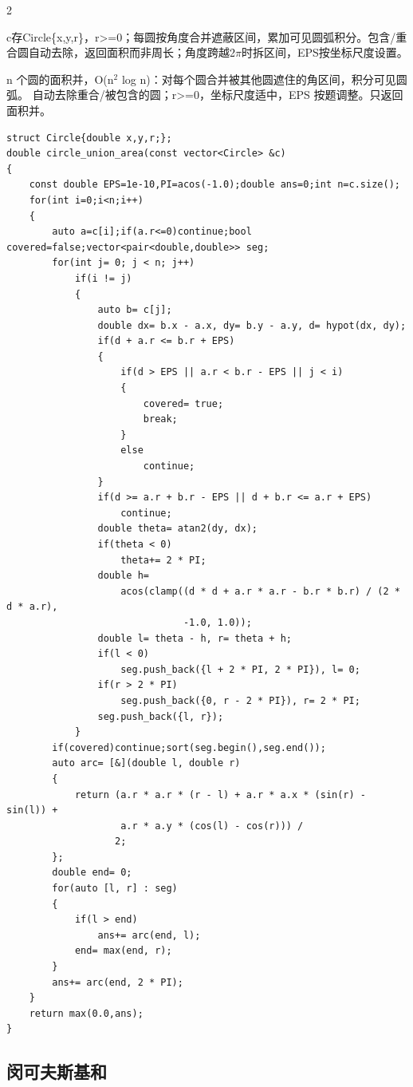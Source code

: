 \documentclass[UTF8,fontset=fandol,a4paper,twoside]{ctexart}
\newcommand{\note}[1]{{\fontsize{10}{12}\selectfont #1\par}}
\begin{document}
\begin{multicols}{2}
\note{c存Circle\{x,\allowbreak{}y,\allowbreak{}r\}，r>\allowbreak{}=\allowbreak{}0；每圆按角度合并遮蔽区间，累加可见圆弧积分。包含/\allowbreak{}重合圆自动去除，返回面积而非周长；角度跨越2\ensuremath{\pi}时拆区间，EPS按坐标尺度设置。}
\note{n 个圆的面积并，O(\allowbreak{}n\ensuremath{^2} log n)\allowbreak{}：对每个圆合并被其他圆遮住的角区间，积分可见圆弧。 自动去除重合/\allowbreak{}被包含的圆；r>\allowbreak{}=\allowbreak{}0，坐标尺度适中，EPS 按题调整。只返回面积并。}
\begin{lstlisting}
struct Circle{double x,y,r;};
double circle_union_area(const vector<Circle> &c)
{
    const double EPS=1e-10,PI=acos(-1.0);double ans=0;int n=c.size();
    for(int i=0;i<n;i++)
    {
        auto a=c[i];if(a.r<=0)continue;bool covered=false;vector<pair<double,double>> seg;
        for(int j= 0; j < n; j++)
            if(i != j)
            {
                auto b= c[j];
                double dx= b.x - a.x, dy= b.y - a.y, d= hypot(dx, dy);
                if(d + a.r <= b.r + EPS)
                {
                    if(d > EPS || a.r < b.r - EPS || j < i)
                    {
                        covered= true;
                        break;
                    }
                    else
                        continue;
                }
                if(d >= a.r + b.r - EPS || d + b.r <= a.r + EPS)
                    continue;
                double theta= atan2(dy, dx);
                if(theta < 0)
                    theta+= 2 * PI;
                double h=
                    acos(clamp((d * d + a.r * a.r - b.r * b.r) / (2 * d * a.r),
                               -1.0, 1.0));
                double l= theta - h, r= theta + h;
                if(l < 0)
                    seg.push_back({l + 2 * PI, 2 * PI}), l= 0;
                if(r > 2 * PI)
                    seg.push_back({0, r - 2 * PI}), r= 2 * PI;
                seg.push_back({l, r});
            }
        if(covered)continue;sort(seg.begin(),seg.end());
        auto arc= [&](double l, double r)
        {
            return (a.r * a.r * (r - l) + a.r * a.x * (sin(r) - sin(l)) +
                    a.r * a.y * (cos(l) - cos(r))) /
                   2;
        };
        double end= 0;
        for(auto [l, r] : seg)
        {
            if(l > end)
                ans+= arc(end, l);
            end= max(end, r);
        }
        ans+= arc(end, 2 * PI);
    }
    return max(0.0,ans);
}
\end{lstlisting}
\subsection{闵可夫斯基和}


\end{multicols}
\end{document}
